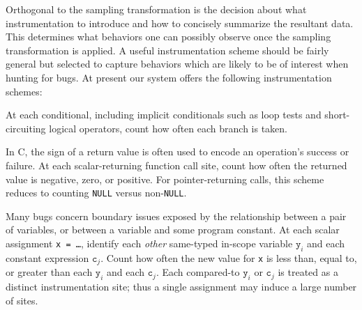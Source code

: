 \documentclass{sig-alternate}
\begin{document}
Orthogonal to the sampling transformation is the decision about what
instrumentation to introduce and how to concisely
summarize the resultant data.  This determines what behaviors one can
possibly observe once the sampling transformation is applied.  A useful instrumentation
scheme should be fairly general but selected to capture behaviors
which are likely to be of interest when hunting for bugs.  At present
our system offers the following instrumentation schemes:

\begin{description}
\sloppy
\item[branches:] At each conditional, including implicit conditionals
such as loop tests and short-circuiting logical operators,
  count how often each branch is taken.  

\item[returns:] In C, the
  sign of a return value is often used to encode an operation's success or failure.
  At each scalar-returning function call site, count how
  often the returned value is negative, zero, or positive.  For
  pointer-returning calls, this scheme reduces to counting
  \texttt{NULL} versus non-\texttt{NULL}.  

\item[scalar-pairs:] Many bugs
  concern boundary issues exposed by the relationship between a pair
  of variables, or between a variable and some program constant.  At
  each scalar assignment \texttt{x = \dots}, identify each
  \emph{other} same-typed in-scope variable $\mathtt{y}_i$ and each
  constant expression $\mathtt{c}_j$.  Count how often the new value
  for \texttt{x} is less than, equal to, or greater than each
  $\mathtt{y}_i$ and each $\mathtt{c}_j$.  
Each compared-to $\mathtt{y}_i$
  or $\mathtt{c}_j$ is treated as a distinct instrumentation site;
  thus a single assignment may induce a large number of sites.  
\end{description}
\end{document}
